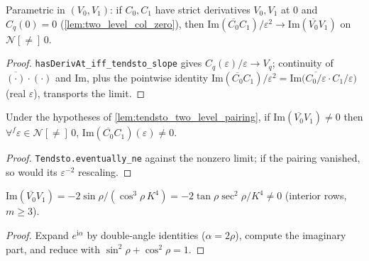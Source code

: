 \begin{lemma}
  \label{lem:tendsto_two_level_pairing}
  Parametric in $(V_0, V_1)$: if $C_0, C_1$ have strict derivatives
  $V_0, V_1$ at $0$ and $C_q(0) = 0$ (\cref{lem:two_level_col_zero}), then
  $\mathrm{Im}(\overline{C_0}C_1)/\varepsilon^2 \to
  \mathrm{Im}(\overline{V_0}V_1)$ on $\mathcal N[\ne]\,0$.
\end{lemma}
\begin{proof}
  \texttt{hasDerivAt\_iff\_tendsto\_slope} gives
  $C_q(\varepsilon)/\varepsilon \to V_q$; continuity of
  $\overline{(\cdot)}\cdot(\cdot)$ and $\mathrm{Im}$, plus the pointwise
  identity $\mathrm{Im}(\overline{C_0}C_1)/\varepsilon^2 =
  \mathrm{Im}\bigl(\overline{C_0/\varepsilon}\cdot C_1/\varepsilon\bigr)$
  (real $\varepsilon$), transports the limit.
\end{proof}

\begin{lemma}
  \label{lem:eventually_two_level_pairing_ne}
  Under the hypotheses of \cref{lem:tendsto_two_level_pairing}, if
  $\mathrm{Im}(\overline{V_0}V_1) \ne 0$ then
  $\forall^f \varepsilon \in \mathcal N[\ne]\,0$,
  $\mathrm{Im}(\overline{C_0}C_1)(\varepsilon) \ne 0$.
\end{lemma}
\begin{proof}
  \texttt{Tendsto.eventually\_ne} against the nonzero limit; if the pairing
  vanished, so would its $\varepsilon^{-2}$ rescaling.
\end{proof}

\begin{lemma}
  \label{lem:im_conj_two_level_v}
  $\mathrm{Im}(\overline{V_0}V_1) = -2\sin\rho/(\cos^3\rho\,K^4)
  = -2\tan\rho\sec^2\rho/K^4 \ne 0$ (interior rows, $m \ge 3$).
\end{lemma}
\begin{proof}
  Expand $e^{\mathrm{i}\alpha}$ by double-angle identities
  ($\alpha = 2\rho$), compute the imaginary part, and reduce with
  $\sin^2\rho + \cos^2\rho = 1$.
\end{proof}

